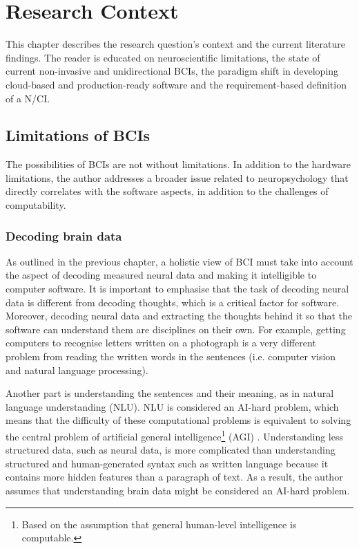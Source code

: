 \chapter{Research Context}
\graphicspath{{Chapter2/Figs/}{Chapter2/Figs/}}

This chapter describes the research question's context and the current literature findings. The reader is educated on neuroscientific limitations, the state of current non-invasive and unidirectional BCIs, the paradigm shift in developing cloud-based and production-ready software and the requirement-based definition of a N/CI.

\section{Limitations of BCIs}
\label{chapter2-limitations-of-bcis}

The possibilities of BCIs are not without limitations. In addition to the hardware limitations, the author addresses a broader issue related to neuropsychology that directly correlates with the software aspects, in addition to the challenges of computability.

\subsection{Decoding brain data}
\label{chapter2-decoding-brain-data}

As outlined in the previous chapter, a holistic view of BCI must take into account the aspect of decoding measured neural data and making it intelligible to computer software. It is important to emphasise that the task of decoding neural data is different from decoding thoughts, which is a critical factor for software. Moreover, decoding neural data and extracting the thoughts behind it so that the software can understand them are disciplines on their own. For example, getting computers to recognise letters written on a photograph is a very different problem from reading the written words in the sentences (i.e. computer vision and natural language processing).

Another part is understanding the sentences and their meaning, as in natural language understanding (NLU). NLU is considered an AI-hard problem, which means that the difficulty of these computational problems is equivalent to solving the central problem of artificial general intelligence\footnote{Based on the assumption that general human-level intelligence is computable.} (AGI) \citep{demasi_theoretical_2010}. Understanding less structured data, such as neural data, is more complicated than understanding structured and human-generated syntax such as written language because it contains more hidden features than a paragraph of text. As a result, the author assumes that understanding brain data might be considered an AI-hard problem.

